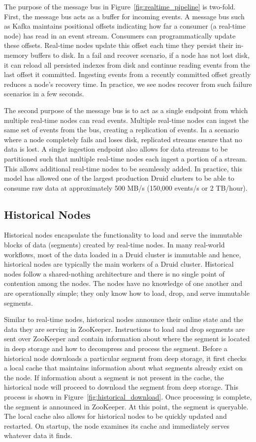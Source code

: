 \documentclass{sig-alternate-2013}
\begin{document}
The purpose of the message bus in Figure~\ref{fig:realtime_pipeline} is
two-fold. First, the message bus acts as a buffer for incoming events. A
message bus such as Kafka maintains positional offsets indicating how far a
consumer (a real-time node) has read in an event stream. Consumers can
programmatically update these offsets. Real-time nodes update this offset each
time they persist their in-memory buffers to disk. In a fail and recover
scenario, if a node has not lost disk, it can reload all persisted indexes from
disk and continue reading events from the last offset it committed. Ingesting
events from a recently committed offset greatly reduces a node's recovery time.
In practice, we see nodes recover from such failure scenarios in a
few seconds.

The second purpose of the message bus is to act as a single endpoint from which
multiple real-time nodes can read events. Multiple real-time nodes can ingest
the same set of events from the bus, creating a replication of events. In a
scenario where a node completely fails and loses disk, replicated streams
ensure that no data is lost. A single ingestion endpoint also allows for data
streams to be partitioned such that multiple real-time nodes each ingest a
portion of a stream. This allows additional real-time nodes to be seamlessly
added. In practice, this model has allowed one of the largest production Druid
clusters to be able to consume raw data at approximately 500 MB/s (150,000
events/s or 2 TB/hour).

\subsection{Historical Nodes}
Historical nodes encapsulate the functionality to load and serve the immutable
blocks of data (segments) created by real-time nodes. In many real-world
workflows, most of the data loaded in a Druid cluster is immutable and hence,
historical nodes are typically the main workers of a Druid cluster. Historical
nodes follow a shared-nothing architecture and there is no single point of
contention among the nodes. The nodes have no knowledge of one another and are
operationally simple; they only know how to load, drop, and serve immutable
segments.

Similar to real-time nodes, historical nodes announce their online state and
the data they are serving in ZooKeeper. Instructions to load and drop segments
are sent over ZooKeeper and contain information about where the segment is
located in deep storage and how to decompress and process the segment. Before
a historical node downloads a particular segment from deep storage, it first
checks a local cache that maintains information about what segments already
exist on the node. If information about a segment is not present in the cache,
the historical node will proceed to download the segment from deep storage.
This process is shown in Figure~\ref{fig:historical_download}. Once processing
is complete, the segment is announced in ZooKeeper. At this point, the segment
is queryable. The local cache also allows for historical nodes to be quickly
updated and restarted. On startup, the node examines its cache and immediately
serves whatever data it finds.
\end{document}
